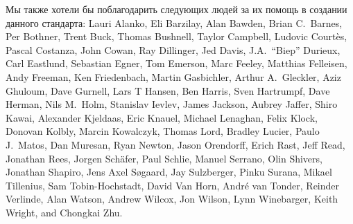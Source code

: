 Мы также хотели бы поблагодарить следующих людей за их помощь в создании данного стандарта: Lauri Alanko,
Eli Barzilay, Alan Bawden, Brian C.\ Barnes, Per Bothner, Trent Buck, Thomas Bushnell, Taylor
Campbell, Ludovic Court\`es, Pascal Costanza, John Cowan, Ray Dillinger, Jed Davis,
J.A.\ ``Biep'' Durieux, Carl Eastlund, Sebastian Egner, Tom Emerson, Marc Feeley, Matthias
Felleisen, Andy Freeman, Ken Friedenbach, Martin Gasbichler, Arthur A.\ Gleckler, Aziz Ghuloum,
Dave Gurnell, Lars T Hansen, Ben Harris, Sven Hartrumpf, Dave Herman, Nils M.\ Holm, Stanislav
Ievlev, James Jackson, Aubrey Jaffer, Shiro Kawai, Alexander Kjeldaas, Eric Knauel, Michael
Lenaghan, Felix Klock, Donovan Kolbly, Marcin Kowalczyk, Thomas Lord, Bradley Lucier, Paulo
J.\ Matos, Dan Muresan, Ryan Newton, Jason Orendorff, Erich Rast, Jeff Read, Jonathan Rees,
Jorgen Sch\"afer, Paul Schlie, Manuel Serrano, Olin Shivers, Jonathan Shapiro, Jens Axel
S\o{}gaard, Jay Sulzberger, Pinku Surana, Mikael Tillenius, Sam Tobin-Hochstadt, David Van Horn,
Andr\'e van Tonder, Reinder Verlinde, Alan Watson, Andrew Wilcox, Jon Wilson, Lynn Winebarger,
Keith Wright, and Chongkai Zhu.\vspace{4mm}

